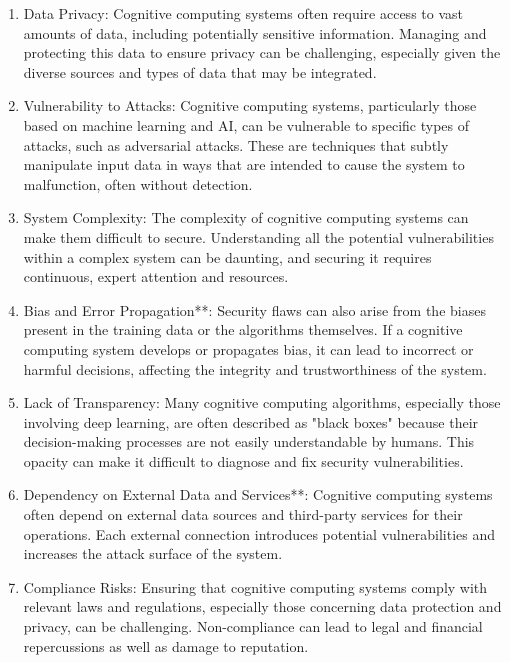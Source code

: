 \documentclass{article}
\begin{document}
\begin{enumerate}
	\item Data Privacy: Cognitive computing systems often require access to vast amounts of data, including potentially sensitive information. Managing and protecting this data to ensure privacy can be challenging, especially given the diverse sources and types of data that may be integrated.

	\item Vulnerability to Attacks: Cognitive computing systems, particularly those based on machine learning and AI, can be vulnerable to specific types of attacks, such as adversarial attacks. These are techniques that subtly manipulate input data in ways that are intended to cause the system to malfunction, often without detection.

	\item System Complexity: The complexity of cognitive computing systems can make them difficult to secure. Understanding all the potential vulnerabilities within a complex system can be daunting, and securing it requires continuous, expert attention and resources.

	\item Bias and Error Propagation**: Security flaws can also arise from the biases present in the training data or the algorithms themselves. If a cognitive computing system develops or propagates bias, it can lead to incorrect or harmful decisions, affecting the integrity and trustworthiness of the system.

	\item Lack of Transparency: Many cognitive computing algorithms, especially those involving deep learning, are often described as "black boxes" because their decision-making processes are not easily understandable by humans. This opacity can make it difficult to diagnose and fix security vulnerabilities.

	\item Dependency on External Data and Services**: Cognitive computing systems often depend on external data sources and third-party services for their operations. Each external connection introduces potential vulnerabilities and increases the attack surface of the system.

	\item Compliance Risks: Ensuring that cognitive computing systems comply with relevant laws and regulations, especially those concerning data protection and privacy, can be challenging. Non-compliance can lead to legal and financial repercussions as well as damage to reputation.
\end{enumerate}
\end{document}

